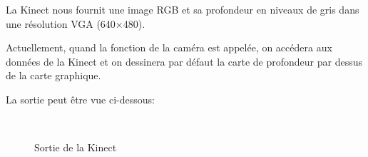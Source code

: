 \documentclass[a4paper,12pt]{article}
\begin{document}
La Kinect nous fournit une image RGB et sa profondeur en niveaux de
gris dans une résolution VGA (640×480).

Actuellement, quand la fonction de la caméra est appelée, on accédera
aux données de la Kinect et on dessinera par défaut la carte de
profondeur par dessus de la carte graphique. 



La sortie peut être vue ci-dessous:

\begin{center} 
  \begin{figure}
    \begin{center} 
      \
      \hspace{1cm} \
    \caption{Sortie de la Kinect}
    \end{center}
  \end{figure}
\end{center}
\end{document}
